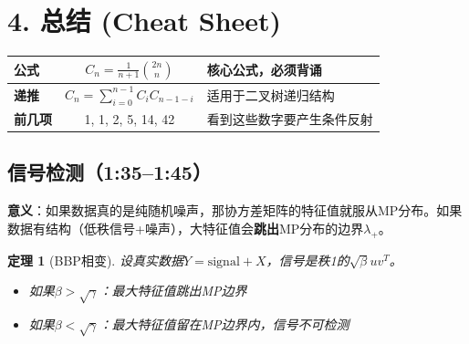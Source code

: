 \documentclass[11pt,a4paper]{ctexart}
\newtheorem{theorem}{定理}[section]
\theoremstyle{definition}
\theoremstyle{remark}
\begin{document}
\section{4. 总结 (Cheat Sheet)}

\begin{table}[h]
\centering
\begin{tabular}{|l|c|l|}
\hline
\textbf{公式} & $C_n = \frac{1}{n+1}\binom{2n}{n}$ & 核心公式，必须背诵 \\ \hline
\textbf{递推} & $C_n = \sum_{i=0}^{n-1} C_i C_{n-1-i}$ & 适用于二叉树递归结构 \\ \hline
\textbf{前几项} & 1, 1, 2, 5, 14, 42 & 看到这些数字要产生条件反射 \\ \hline
\end{tabular}
\end{table}


\subsection{信号检测（1:35--1:45）}

\textbf{意义}：如果数据真的是纯随机噪声，那协方差矩阵的特征值就服从MP分布。如果数据有结构（低秩信号+噪声），大特征值会\textbf{跳出}MP分布的边界$\lambda_+$。

\begin{theorem}[BBP相变]
设真实数据$Y = \text{signal} + X$，信号是秩1的$\sqrt{\beta} u v^T$。
\begin{itemize}
    \item 如果$\beta > \sqrt{\gamma}$：最大特征值跳出MP边界
    \item 如果$\beta < \sqrt{\gamma}$：最大特征值留在MP边界内，信号不可检测
\end{itemize}
\end{theorem}
\end{document}
